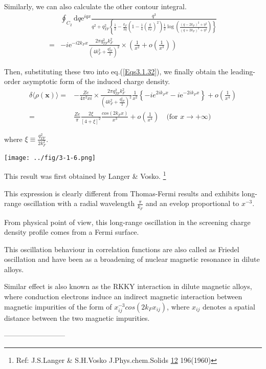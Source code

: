 \begin{itemize}
Similarly, we can also calculate the other contour integral.
\begin{equation} \label{Eqs3.1.35} \begin{split}
&\oint_{C_2} \mathrm{d} q \mathrm{e}^{i q x} \frac{q^3}{q^2 + q_{TF}^2 \left\{\frac{1}{2}-\frac{k_F}{2q}\left( 1-\frac{1}{4}(\frac{q}{k_F})^2 \right) \frac{1}{2} \log \left( \frac{(q-2 k_F)^2 + \eta^2}{(q + 2 k_F)^2 + \eta^2}\right) \right\}}\\
=& -i \mathrm{e}^{-i 2 k_F x} \frac{2\pi q_{TF}^2 k_F^2}{\left( 4 k_F^2 + \frac{q_{TF}^2}{2} \right)^2} \times \left( \frac{1}{x^2} + o(\frac{1}{x^3}) \right)
\end{split}\end{equation}

Then, substituting these two into eq.(\ref{Eqs3.1.32}), we finally obtain the leading-order asymptotic form of the induced charge density.
\begin{equation} \label{Eqs3.1.36} \begin{split}
\delta \langle \rho(\mathbf{x}) \rangle =& -\frac{Z e}{4\pi^2 x i} \times \frac{2\pi q_{TF}^2 k_F^2}{\left( 4 k_F^2 + \frac{q_{TF}^2}{2} \right)^2} \frac{1}{x^2} \left\{ -i e^{2i k_F x} -i \mathrm{e}^{-2i k_F x} \right\} + o(\frac{1}{x^4})\\
=& \frac{Z e}{\pi} \frac{2 \xi}{[4+\xi]^2} \frac{cos(2 k_F x)}{x^3} + o(\frac{1}{x^4})\quad\text{(for $x \rightarrow +\infty$)}
\end{split}\end{equation}

where $\xi \equiv \frac{q_{TF}^2}{2 k_F^2}$.
\begin{center} \label{Fig3.1.6}
\texttt{[image: ../fig/3-1-6.png]}
\end{center}

This result was first obtained by Langer \& Vosko.
\footnote{Ref: J.S.Langer \& S.H.Vosko J.Phys.chem.Solids \underline{12} 196(1960)}

This expression is clearly different from Thomas-Fermi results and exhibits long-range oscillation with a radial wavelength $\frac{\pi}{k_F}$ and an evelop proportional to $x^{-3}$.

From physical point of view, this long-range oscillation in the screening charge density profile comes from a Fermi surface.

This oscillation behaviour in correlation functions are also called as Friedel oscillation and have been as a broadening of nuclear magnetic resonance in dilute alloys.

Similar effect is also known as the RKKY interaction in dilute magnetic alloys, where conduction electrons induce an indirect magnetic interaction between magnetic impurities of the form of $x_{ij}^{-3} cos(2 k_F x_{ij})$, where $x_{ij}$ denotes a spatial distance between the two magnetic impurities.
\end{itemize}
\begin{center}--------------------------\end{center}


